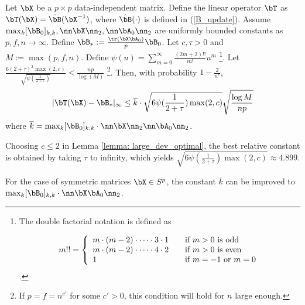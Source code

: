\begin{lemma} \label{lemma: large_dev_optimal}
	Let $\bX$ be a $p\times p$ data-independent matrix. Define the linear operator $\bT$ as $\bT(\bX) = \hat{\bB}(\bX^{-1})$, where $\hat{\bB}(\cdot)$ is defined in (\ref{B_update}). Assume $\max_{k}[\bB_0]_{k,k}, \nn \bX\nn_2, \nn \bA_0\nn_2$ are uniformly bounded constants as $p,f,n\to\infty$. Define $\bB_*:=\frac{\tr(\bX \bA_0)}{p} \bB_0$. Let $c,\tau>0$ and $M:=\max(p,f,n)$. Define $\psi(u)=\sum_{m=0}^\infty \frac{(2m+2)!!}{m!} u^m$ \footnote{The double factorial notation is defined as 

\[
m!! = \left\{ 
  \begin{array}{l l}
    m\cdot (m-2) \cdot \cdots \cdot 3 \cdot 1 & \quad \text{if $m>0$ is odd}\\
    m\cdot (m-2) \cdot \cdots \cdot 4 \cdot 2 & \quad \text{if $m>0$ is even}\\
    1 & \quad \text{if $m=-1$ or $m=0$}\\
  \end{array} \right.
\]  
	. }. Let $\frac{6 (2+\tau)^2 \max(2,c) }{\sqrt{\psi(\frac{1}{2+\tau})}}<\frac{np}{\log(M)}$ \footnote{If $p=f=n^{c'}$ for some $c'>0$, this condition will hold for $n$ large enough.}. Then, with probability $1-\frac{2}{n^c}$,
	\begin{equation*}
		|\bT(\bX)-\bB_*|_\infty \leq \overline{k} \cdot \sqrt{6 \psi(\frac{1}{2+\tau}) \max(2,c)} \sqrt{\frac{\log M}{np}}
	\end{equation*}
	where $\overline{k}=\max_{k}[\bB_0]_{k,k} \cdot \nn \bX\nn_2 \nn \bA_0\nn_2$.
\end{lemma}

\begin{remark}
	Choosing $c\leq 2$ in Lemma \ref{lemma: large_dev_optimal}, the best relative constant is obtained by taking $\tau$ to infinity, which yields $\sqrt{6 \psi(\frac{1}{2+\tau}) \max(2,c)} \approx 4.899$.
\end{remark}
\begin{remark}
	For the case of symmetric matrices $\bX\in S^p$, the constant $\overline{k}$ can be improved to $\max_{k}[\bB_0]_{k,k} \cdot \nn \bX \bA_0\nn_2$.
\end{remark}


